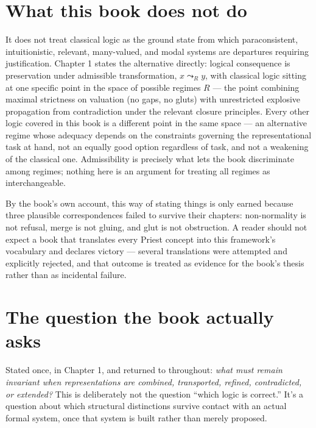 \hypertarget{what-this-book-does-not-do}{%
\section{What this book does not do}\label{what-this-book-does-not-do}}

It does not treat classical logic as the ground state from which
paraconsistent, intuitionistic, relevant, many-valued, and modal systems
are departures requiring justification. Chapter 1 states the alternative
directly: logical consequence is preservation under admissible
transformation, \(x \leadsto_R y\), with classical logic sitting at one
specific point in the space of possible regimes \(R\) --- the point
combining maximal strictness on valuation (no gaps, no gluts) with
unrestricted explosive propagation from contradiction under the relevant
closure principles. Every other logic covered in this book is a
different point in the same space --- an alternative regime whose adequacy
depends on the constraints governing the representational task at hand,
not an equally good option regardless of task, and not a weakening of
the classical one. Admissibility is precisely what lets the book
discriminate among regimes; nothing here is an argument for treating all
regimes as interchangeable.

By the book's own account, this way of stating things is only earned
because three plausible correspondences failed to survive their
chapters: non-normality is not refusal, merge is not gluing, and glut is
not obstruction. A reader should not expect a book that translates every
Priest concept into this framework's vocabulary and declares victory ---
several translations were attempted and explicitly rejected, and that
outcome is treated as evidence for the book's thesis rather than as
incidental failure.

\hypertarget{the-question-the-book-actually-asks}{%
\section{The question the book actually asks}\label{the-question-the-book-actually-asks}}

Stated once, in Chapter 1, and returned to throughout: \emph{what must remain
invariant when representations are combined, transported, refined,
contradicted, or extended?} This is deliberately not the question
``which logic is correct.'' It's a question about which structural
distinctions survive contact with an actual formal system, once that
system is built rather than merely proposed.


